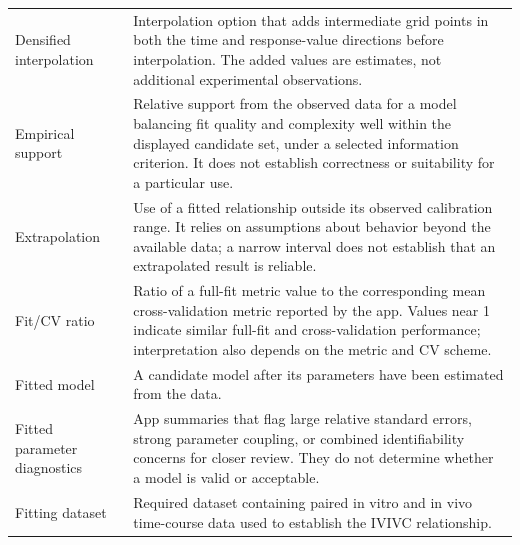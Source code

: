 \begin{longtable}{@{}>{\raggedright\arraybackslash}p{}>{\raggedright\arraybackslash}p{}@{}}

Densified interpolation & Interpolation option that adds intermediate grid points in both the time and response-value directions before interpolation. The added values are estimates, not additional experimental observations. \\

Empirical support & Relative support from the observed data for a model balancing fit quality and complexity well within the displayed candidate set, under a selected information criterion. It does not establish correctness or suitability for a particular use. \\


Extrapolation & Use of a fitted relationship outside its observed calibration range. It relies on assumptions about behavior beyond the available data; a narrow interval does not establish that an extrapolated result is reliable. \\

Fit/CV ratio & Ratio of a full-fit metric value to the corresponding mean cross-validation metric reported by the app. Values near 1 indicate similar full-fit and cross-validation performance; interpretation also depends on the metric and CV scheme. \\

Fitted model & A candidate model after its parameters have been estimated from the data. \\

Fitted parameter diagnostics & App summaries that flag large relative standard errors, strong parameter coupling, or combined identifiability concerns for closer review. They do not determine whether a model is valid or acceptable. \\

Fitting dataset & Required dataset containing paired in vitro and in vivo time-course data used to establish the IVIVC relationship. \\


\end{longtable}
